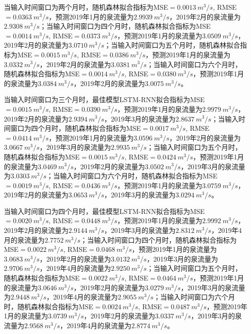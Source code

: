 \begin{enumerate}
    当输入时间窗口为两个月时，随机森林拟合指标为MSE$=\SI{0.0013}{m^{3}/s}$, RMSE$=\SI{0.0363}{m^{3}/s}$，预测2019年1月的泉流量为$\SI{2.9939}{m^{3}/s}$，2019年2月的泉流量为$\SI{2.9308}{m^{3}/s}$；当输入时间窗口为四个月时，随机森林拟合指标为MSE$=\SI{0.0014}{m^{3}/s}$, RMSE$=\SI{0.0373}{m^{3}/s}$，预测2019年1月的泉流量为$\SI{3.0509}{m^{3}/s}$，2019年2月的泉流量为$\SI{3.0710}{m^{3}/s}$；当输入时间窗口为五个月时，随机森林拟合指标为MSE$=\SI{0.0015}{m^{3}/s}$, RMSE$=\SI{0.0386}{m^{3}/s}$，预测2019年1月的泉流量为$\SI{3.0332}{m^{3}/s}$，2019年2月的泉流量为$\SI{3.0381}{m^{3}/s}$；当输入时间窗口为六个月时，随机森林拟合指标为MSE$=\SI{0.0014}{m^{3}/s}$, RMSE$=\SI{0.0380}{m^{3}/s}$，预测2019年1月的泉流量为$\SI{3.0384}{m^{3}/s}$，2019年2月的泉流量为$\SI{3.0075}{m^{3}/s}$。

    当输入时间窗口为三个月时，最佳模型LSTM-RNN拟合指标为MSE$=\SI{0.0015}{m^{3}/s}$, RMSE$=\SI{0.0390}{m^{3}/s}$，预测2019年1月的泉流量为$\SI{2.9979}{m^{3}/s}$，2019年2月的泉流量为$\SI{2.9394}{m^{3}/s}$，2019年3月的泉流量为$\SI{2.8637}{m^{3}/s}$；当输入时间窗口为四个月时，随机森林拟合指标为MSE$=\SI{0.0017}{m^{3}/s}$, RMSE$=\SI{0.0414}{m^{3}/s}$，预测2019年1月的泉流量为$\SI{3.0596}{m^{3}/s}$，2019年2月的泉流量为$\SI{3.0667}{m^{3}/s}$，2019年3月的泉流量为$\SI{2.9935}{m^{3}/s}$；当输入时间窗口为五个月时，随机森林拟合指标为MSE$=\SI{0.0015}{m^{3}/s}$, RMSE$=\SI{0.0424}{m^{3}/s}$，预测2019年1月的泉流量为$\SI{3.0469}{m^{3}/s}$，2019年2月的泉流量为$\SI{3.0502}{m^{3}/s}$，2019年3月的泉流量为$\SI{3.0303}{m^{3}/s}$；当输入时间窗口为六个月时，随机森林拟合指标为MSE$=\SI{0.0019}{m^{3}/s}$, RMSE$=\SI{0.0436}{m^{3}/s}$，预测2019年1月的泉流量为$\SI{3.0759}{m^{3}/s}$，2019年2月的泉流量为$\SI{3.0653}{m^{3}/s}$，2019年3月的泉流量为$\SI{3.0294}{m^{3}/s}$。

    当输入时间窗口为四个月时，最佳模型LSTM-RNN拟合指标为MSE$=\SI{0.0020}{m^{3}/s}$, RMSE$=\SI{0.0448}{m^{3}/s}$，预测2019年1月的泉流量为$\SI{2.9992}{m^{3}/s}$，2019年2月的泉流量为$\SI{2.9144}{m^{3}/s}$，2019年3月的泉流量为$\SI{2.8312}{m^{3}/s}$，2019年4月的泉流量为$\SI{2.7752}{m^{3}/s}$；当输入时间窗口为四个月时，随机森林拟合指标为MSE$=\SI{0.0022}{m^{3}/s}$, RMSE$=\SI{0.0468}{m^{3}/s}$，预测2019年1月的泉流量为$\SI{3.0683}{m^{3}/s}$，2019年2月的泉流量为$\SI{3.0132}{m^{3}/s}$，2019年3月的泉流量为$\SI{2.9706}{m^{3}/s}$，2019年4月的泉流量为$\SI{2.9250}{m^{3}/s}$；当输入时间窗口为五个月时，随机森林拟合指标为MSE$=\SI{0.0022}{m^{3}/s}$, RMSE$=\SI{0.0464}{m^{3}/s}$，预测2019年1月的泉流量为$\SI{3.0646}{m^{3}/s}$，2019年2月的泉流量为$\SI{3.0279}{m^{3}/s}$，2019年3月的泉流量为$\SI{2.9448}{m^{3}/s}$，2019年4月的泉流量为$\SI{2.9055}{m^{3}/s}$；当输入时间窗口为六个月时，随机森林拟合指标为MSE$=\SI{0.0024}{m^{3}/s}$, RMSE$=\SI{0.0487}{m^{3}/s}$，预测2019年1月的泉流量为$\SI{3.0739}{m^{3}/s}$，2019年2月的泉流量为$\SI{3.0337}{m^{3}/s}$，2019年3月的泉流量为$\SI{2.9568}{m^{3}/s}$，2019年4月的泉流量为$\SI{2.8774}{m^{3}/s}$。
  

\end{enumerate}
